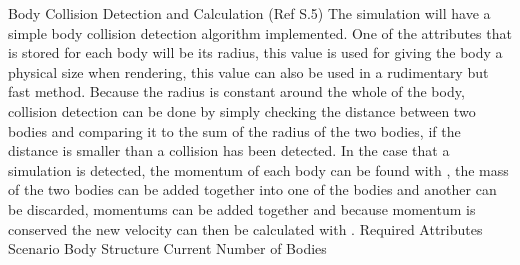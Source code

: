 Body Collision Detection and Calculation (Ref S.5)
The simulation will have a simple body collision detection algorithm implemented.
One of the attributes that is stored for each body will be its radius, this value is used for giving the body a physical size when rendering, this value can also be used in a rudimentary but fast method.
Because the radius is constant around the whole of the body, collision detection can be done by simply checking the distance between two bodies and comparing it to the sum of the radius of the two bodies, if the distance is smaller than a collision has been detected.
In the case that a simulation is detected, the momentum of each body can be found with , the mass of the two bodies can be added together into one of the bodies and another can be discarded, momentums can be added together and because momentum is conserved the new velocity can then be calculated with .
Required Attributes
Scenario Body Structure
Current Number of Bodies

